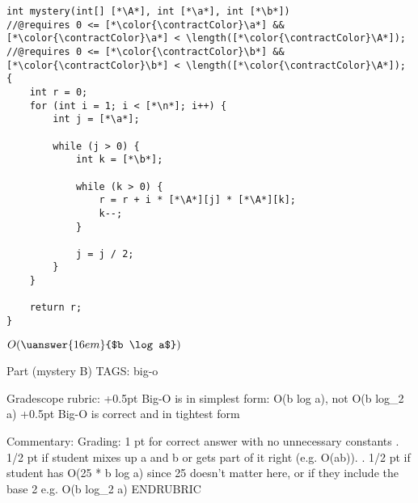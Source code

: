 \bgroup
\renewcommand{\a}
{a} %
\renewcommand{\b}
{b} %
\newcommand{\A}
{A} %
\newcommand{\n}
{25} %

\begin{lstlisting}
int mystery(int[] [*\A*], int [*\a*], int [*\b*])
//@requires 0 <= [*\color{\contractColor}\a*] && [*\color{\contractColor}\a*] < \length([*\color{\contractColor}\A*]);
//@requires 0 <= [*\color{\contractColor}\b*] && [*\color{\contractColor}\b*] < \length([*\color{\contractColor}\A*]);
{
    int r = 0;
    for (int i = 1; i < [*\n*]; i++) {
        int j = [*\a*];

        while (j > 0) {
            int k = [*\b*];

            while (k > 0) {
                r = r + i * [*\A*][j] * [*\A*][k];
                k--;
            }

            j = j / 2;
        }
    }

    return r;
}
\end{lstlisting}

\begin{framed}\vspace{0.25in}
$O(\uanswer{16em}{$b \log a$})$
\end{framed}

\RUBRIC
Part (mystery B)
TAGS: big-o

Gradescope rubric:
+0.5pt Big-O is in simplest form: O(b log a), not O(b log_2 a)
+0.5pt Big-O is correct and in tightest form

Commentary:
Grading: 1 pt for correct answer with no unnecessary constants
. 1/2 pt if student mixes up a and b or gets part of it right
  (e.g. O(ab)).
. 1/2 pt if student has O(25 * b log a) since 25 doesn't matter
  here, or if they include the base 2 e.g. O(b log_2 a)
ENDRUBRIC

\egroup